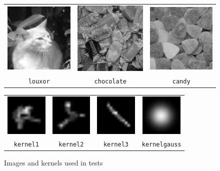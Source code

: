
    \begin{figure}
    \centering
    \begin{tabular}{c c c}\includegraphics[width=4cm]{images/louxor} 
& \includegraphics[width=4cm]{images/chocolate} 
& \includegraphics[width=4cm]{images/candy} 
\\ 
\texttt{louxor} 
& \texttt{chocolate} 
& \texttt{candy} 

    \end{tabular}
    \begin{tabular}{c c c c}\includegraphics[width=2cm]{images/kernel1} 
& \includegraphics[width=2cm]{images/kernel2} 
& \includegraphics[width=2cm]{images/kernel3} 
& \includegraphics[width=2cm]{images/kernelgauss} 
\\ 
\texttt{kernel1} 
& \texttt{kernel2} 
& \texttt{kernel3} 
& \texttt{kernelgauss} 

\end{tabular}
\caption{Images and kernels used in tests}
\end{figure}

